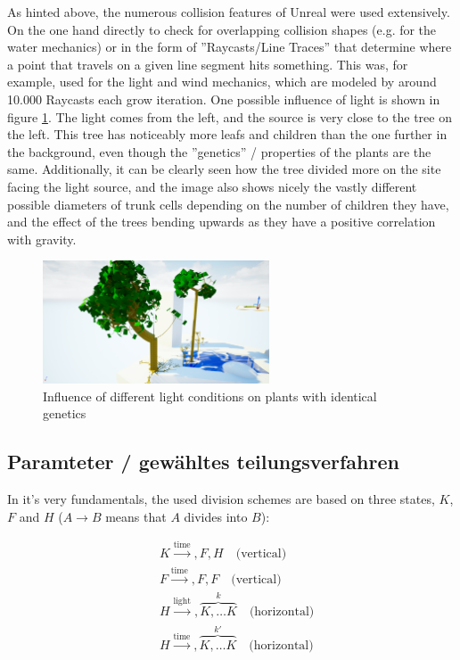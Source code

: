 \documentclass[11pt]{scrartcl}
\begin{document}
As hinted above, the numerous collision features of Unreal were used extensively. On the one hand directly to check for overlapping collision shapes (e.g. for the water mechanics) or in the form of ''Raycasts/Line Traces'' that determine where a point that travels on a given line segment hits something. This was, for example, used for the light and wind mechanics, which are modeled by around 10.000 Raycasts each grow iteration.
One possible influence of light is shown in figure \ref{fig:GrowToLight}. The light comes from the left, and the source is very close to the tree on the left. This tree has noticeably more leafs and children than the one further in the background, even though the ''genetics'' / properties of the plants are the same. Additionally, it can be clearly seen how the tree divided more on the site facing the light source, and the image also shows nicely the vastly different possible diameters of trunk cells depending on the number of children they have, and the effect of the trees bending upwards as they have a positive correlation with gravity. 

\begin{figure}
 	 \centering
 	    \includegraphics[width=0.6\textwidth]{SS_GrowToLight.png}
 	 \caption{Influence of different light conditions on plants with identical genetics}
 	 \label{fig:GrowToLight}
\end{figure}

\subsection{Paramteter / gewähltes teilungsverfahren}
In it's very fundamentals, the used division schemes are based on three states, $K$, $F$ and $H$ ($A \rightarrow B$ means that $A$ divides into $B$):

\begin{align}
	&K \xrightarrow {\text{time}}, F, H \quad \text{(vertical)} \label{eq:K} \\
	&F \xrightarrow {\text{time}}, F, F \quad \text{(vertical)} \label{eq:F}\\
	&H \xrightarrow {\text{light}}, \overbrace{ K, \ldots K}^{k} \quad \text{(horizontal)}  \label{eq:HLight} \\
	&H \xrightarrow {\text{time}}, \overbrace{ K, \ldots K}^{k'} \quad \text{(horizontal)} \label{eq:HTime}
\end{align}
\end{document}
